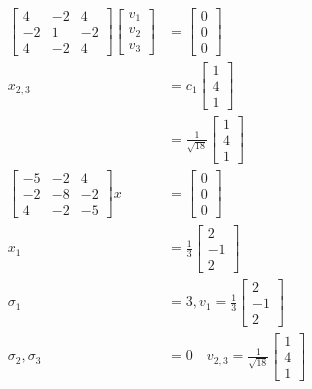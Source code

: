 \documentclass[12pt, letterpaper]{article}
\begin{document}
\begin{align*}
    \begin{bmatrix} 4 & -2 & 4 \\ -2 & 1 & -2 \\ 4 & -2 & 4 \end{bmatrix} \begin{bmatrix} v_1 \\ v_2 \\ v_3 \end{bmatrix} &= \begin{bmatrix} 0 \\ 0 \\ 0 \end{bmatrix} \\
    x_{2,3} &= c_1\begin{bmatrix} 1 \\ 4 \\ 1 \end{bmatrix} \\
    &= \frac{1}{\sqrt{18}}\begin{bmatrix} 1 \\ 4 \\ 1 \end{bmatrix} \\
    \begin{bmatrix} -5 & -2 & 4 \\ -2 & -8 & -2 \\ 4 & -2 & -5 \end{bmatrix} x &= \begin{bmatrix} 0 \\ 0 \\ 0 \end{bmatrix} \\
    x_1 &= \frac{1}{3} \begin{bmatrix} 2 \\ -1 \\ 2 \end{bmatrix} \\
    \sigma_1 &= 3, v_1 = \frac{1}{3} \begin{bmatrix} 2 \\ -1 \\ 2 \end{bmatrix} \\
    \sigma_2, \sigma_3 &= 0 \quad v_{2,3} = \frac{1}{\sqrt{18}} \begin{bmatrix} 1 \\ 4 \\ 1\end{bmatrix}\\

\end{align*}
\end{document}
